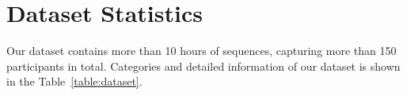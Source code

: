 %

\section{Dataset Statistics}
Our dataset contains more than 10 hours of sequences, capturing more than 150 participants in total. Categories and detailed information of our dataset is shown in the Table~\ref{table:dataset}.

